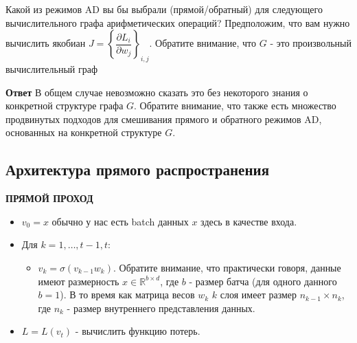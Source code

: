 \documentclass[
  russian,
  letterpaper,
  DIV=11,
  numbers=noendperiod]{scrartcl}
\providecommand{\tightlist}{%
  \setlength{\itemsep}{0pt}\setlength{\parskip}{0pt}}
\begin{document}
\begin{tcolorbox}[enhanced jigsaw, colbacktitle=quarto-callout-color!10!white, toptitle=1mm, bottomrule=.15mm, left=2mm, opacitybacktitle=0.6, colframe=quarto-callout-color-frame, arc=.35mm, bottomtitle=1mm, colback=white, coltitle=black, title=\textcolor{quarto-callout-color}{\faInfo}\hspace{0.5em}{Question}, leftrule=.75mm, opacityback=0, rightrule=.15mm, toprule=.15mm, breakable, titlerule=0mm]

Какой из режимов AD вы бы выбрали (прямой/обратный) для следующего
вычислительного графа арифметических операций? Предположим, что вам
нужно вычислить якобиан
\(J = \left\{ \dfrac{\partial L_i}{\partial w_j} \right\}_{i,j}\).
Обратите внимание, что \(G\) - это произвольный вычислительный граф

\end{tcolorbox}

\textbf{Ответ} В общем случае невозможно сказать это без некоторого
знания о конкретной структуре графа \(G\). Обратите внимание, что также
есть множество продвинутых подходов для смешивания прямого и обратного
режимов AD, основанных на конкретной структуре \(G\).

\subsection{Архитектура прямого
распространения}\label{ux430ux440ux445ux438ux442ux435ux43aux442ux443ux440ux430-ux43fux440ux44fux43cux43eux433ux43e-ux440ux430ux441ux43fux440ux43eux441ux442ux440ux430ux43dux435ux43dux438ux44f}

\textbf{ПРЯМОЙ ПРОХОД}

\begin{itemize}
\item
  \(v_0 = x\) обычно у нас есть batch данных \(x\) здесь в качестве
  входа.
\item
  Для \(k = 1, \ldots, t-1, t\):

  \begin{itemize}
  \tightlist
  \item
    \(v_k = \sigma(v_{k-1}w_k)\). Обратите внимание, что практически
    говоря, данные имеют размерность \(x  \in \mathbb{R}^{b \times d}\),
    где \(b\) - размер батча (для одного данного \(b=1\)). В то время
    как матрица весов \(w_k\) \(k\) слоя имеет размер
    \(n_{k-1} \times n_k\), где \(n_k\) - размер внутреннего
    представления данных.
  \end{itemize}
\item
  \(L = L(v_t)\) - вычислить функцию потерь.
\end{itemize}
\end{document}
